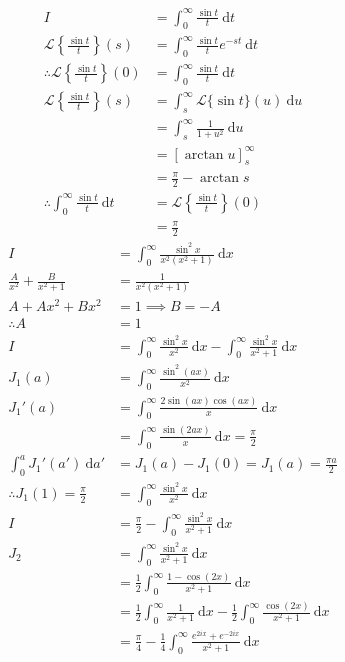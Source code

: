 \documentclass[a4paper,11pt]{article}
\theoremstyle{plain}
\theoremstyle{definition}
\newcommand{\cL}{\mathcal{L}}
\newcommand{\dx}{\text{d}}
\begin{document}
\newline
\begin{align*}
	I&=\int_0^\infty \frac{\sin t}{t}\ \dx t\\
	\cL\left\{\frac{\sin t}{t}\right\}(s)
	&=\int_0^\infty\frac{\sin t}{t}e^{-st}\ \dx t \\
	\therefore \cL\left\{\frac{\sin t}{t}\right\}(0)
	&=\int_0^\infty\frac{\sin t}{t}\ \dx t \\
	\cL\left\{\frac{\sin t}{t}\right\}(s)
	&=\int_s^\infty\cL\{\sin t\}(u)\ \dx u \\
	&=\int_s^\infty\frac{1}{1+u^2}\ \dx u \\
	&={\left[\arctan u\right]}_s^\infty \\
	&=\frac{\pi}{2}-\arctan s \\
	\therefore \int_0^\infty\frac{\sin t}{t}\ \dx t
	&=\cL\left\{\frac{\sin t}{t}\right\}(0)\\
	&=\frac{\pi}{2}
\end{align*}
\newline
\begin{align*}
	I&=\int_0^\infty \frac{\sin^2 x}{x^2(x^2+1)}\ \dx x\\
	\frac{A}{x^2}+\frac{B}{x^2+1}&=\frac{1}{x^2(x^2+1)}\\
	A+Ax^2+Bx^2&=1\implies B=-A\\
	\therefore A&=1\\
	I&=\int_0^\infty \frac{\sin^2 x}{x^2}\ \dx x
	-\int_0^\infty \frac{\sin^2 x}{x^2+1}\ \dx x\\
	J_1(a)&=\int_0^\infty \frac{\sin^2 (ax)}{x^2}\ \dx x\\
	J_1'(a)&=\int_0^\infty \frac{2\sin(ax)\cos(ax)}{x}\ \dx x\\
		   &=\int_0^\infty \frac{\sin(2ax)}{x}\ \dx x=\frac{\pi}{2}\\
	\int_0^a J_1'(a')\ \dx a'&=J_1(a)-J_1(0)=J_1(a)=\frac{\pi a}{2}\\
	\therefore J_1(1)=\frac{\pi}{2}&=\int_0^\infty\frac{\sin^2x}{x^2}\ \dx x\\
	I&=\frac{\pi}{2}
	-\int_0^\infty \frac{\sin^2 x}{x^2+1}\ \dx x\\
	J_2 &= \int_0^\infty \frac{\sin^2 x}{x^2+1}\ \dx x \\
		&= \frac{1}{2}\int_0^\infty \frac{1-\cos(2x)}{x^2+1}\ \dx x \\
		&= \frac{1}{2}\int_0^\infty \frac{1}{x^2+1}\ \dx x
		- \frac{1}{2}\int_0^\infty \frac{\cos(2x)}{x^2+1}\ \dx x \\
		&= \frac{\pi}{4}
		- \frac{1}{4}\int_0^\infty \frac{e^{2ix}+e^{-2ix}}{x^2+1}\ \dx x \\
\end{align*}
\end{document}
